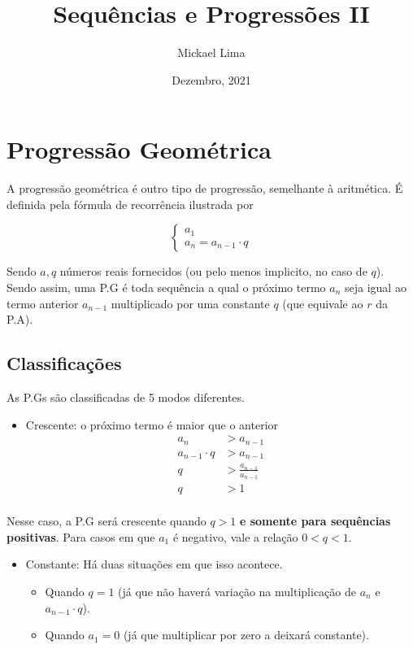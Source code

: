 \documentclass[11pt]{article}
\title{Sequências e Progressões II}
\author{Mickael Lima}
\date{Dezembro, 2021}
\begin{document}
\maketitle
\pagebreak
\tableofcontents
\pagebreak

\section{Progressão Geométrica}

A progressão geométrica é outro tipo de progressão, semelhante à aritmética. É definida pela fórmula de recorrência ilustrada por

\begin{equation*}
\begin{cases}
  a_{1} \\
  a_{n} = a_{n - 1} \cdot q
\end{cases}
\end{equation*}

Sendo $a, q$ números reais fornecidos (ou pelo menos implicito, no caso de $q$). Sendo assim, uma P.G é toda sequência a qual o próximo termo $a_{n}$ seja igual ao termo anterior $a_{n - 1}$ multiplicado por uma constante $q$ (que equivale ao $r$ da P.A).

\subsection{Classificações}

As P.Gs são classificadas de 5 modos diferentes.

\begin{itemize}
        \item Crescente: o próximo termo é maior que o anterior
        \begin{equation*}
        \begin{align*}
          a_{n} &> a_{n - 1} \\
          a_{n - 1} \cdot q &> a_{n - 1} \\
          q &> \frac{a_{n - 1}}{a_{n - 1}} \\
          q &> 1 \\
        \end{align*}
        \end{equation*}
\end{itemize}

Nesse caso, a P.G será crescente quando $q > 1$ \textbf{e somente para sequências positivas}. Para casos em que $a_{1}$ é negativo, vale a relação $0 < q < 1$.
\begin{itemize}
  \item Constante: Há duas situações em que isso acontece.
        \begin{itemize}
                \item Quando $q = 1$ (já que não haverá variação na multiplicação de $a_{n}$ e $a_{n - 1}\cdot q$).
                \item Quando $a_{1} = 0$ (já que multiplicar por zero a deixará constante).
        \end{itemize}
\end{itemize}
\end{document}
